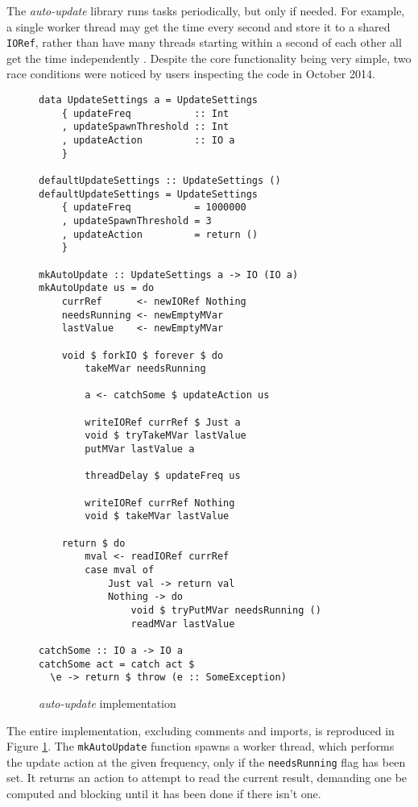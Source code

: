 The \emph{auto-update} library runs tasks periodically, but only if
needed. For example, a single worker thread may get the time every
second and store it to a shared \verb|IORef|, rather than have many
threads starting within a second of each other all get the time
independently \citep{autoupdate}. Despite the core functionality being
very simple, two race conditions were noticed by users inspecting the
code in October 2014.

\begin{figure}[t]
  \centering
  \begin{verbatim}
data UpdateSettings a = UpdateSettings
    { updateFreq           :: Int
    , updateSpawnThreshold :: Int
    , updateAction         :: IO a
    }

defaultUpdateSettings :: UpdateSettings ()
defaultUpdateSettings = UpdateSettings
    { updateFreq           = 1000000
    , updateSpawnThreshold = 3
    , updateAction         = return ()
    }

mkAutoUpdate :: UpdateSettings a -> IO (IO a)
mkAutoUpdate us = do
    currRef      <- newIORef Nothing
    needsRunning <- newEmptyMVar
    lastValue    <- newEmptyMVar

    void $ forkIO $ forever $ do
        takeMVar needsRunning

        a <- catchSome $ updateAction us

        writeIORef currRef $ Just a
        void $ tryTakeMVar lastValue
        putMVar lastValue a

        threadDelay $ updateFreq us

        writeIORef currRef Nothing
        void $ takeMVar lastValue

    return $ do
        mval <- readIORef currRef
        case mval of
            Just val -> return val
            Nothing -> do
                void $ tryPutMVar needsRunning ()
                readMVar lastValue

catchSome :: IO a -> IO a
catchSome act = catch act $
  \e -> return $ throw (e :: SomeException)
  \end{verbatim}
  \caption{\emph{auto-update} implementation}
  \label{fig:example-autoupdate}
\end{figure}

The entire implementation, excluding comments and imports, is
reproduced in Figure \ref{fig:example-autoupdate}. The
\verb|mkAutoUpdate| function spawns a worker thread, which performs
the update action at the given frequency, only if the
\verb|needsRunning| flag has been set. It returns an action to attempt
to read the current result, demanding one be computed and blocking
until it has been done if there isn't one.

